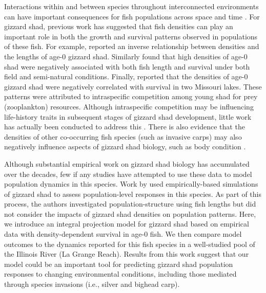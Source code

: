 \documentclass[preprint,review,12pt,authoryear]{elsarticle}
\begin{document}
Interactions within and between species throughout interconnected environments can have important consequences for fish populations across space and time \citep{thorp2006riverine}.  
For gizzard shad, previous work has suggested that fish densities can play an important role in both the growth and survival patterns observed in populations of these fish.  
For example, \citep{buynak1992differential} reported an inverse relationship between densities and the lengths of age-0 gizzard shad.  Similarly \citep{welker1994growth} found that high densities of age-0 shad were negatively associated with both fish length and survival under both field and semi-natural conditions. Finally, \citep{michaletz2010overwinter} reported that the densities of age-0 gizzard shad were negatively correlated with survival in two Missouri lakes.  
These patterns were attributed to intraspecific competition among young shad for prey (zooplankton) resources. Although intraspecific competition may be influencing life-history traits in subsequent stages of gizzard shad development, little work has actually been conducted to address this \citep{dicenzo1996relations}. 
There is also evidence that the densities of other co-occurring fish species (such as invasive carps) may also negatively influence aspects of gizzard shad biology, such as body condition \citep{irons2007reduced,love2018does}.

Although substantial empirical work on gizzard shad biology has accumulated over the decades, few if any studies have attempted to use these data to model population dynamics in this species.
Work by \citet{catalano2010size, catalano2011whole} used empirically-based simulations of gizzard shad to assess population-level responses in this species.
As part of this process, the authors investigated population-structure using fish lengths but did
not consider the impacts of gizzard shad densities on population patterns.
Here, we introduce an integral projection model for gizzard shad based on empirical data with density-dependent survival in age-0 fish.
We then compare model outcomes to the dynamics reported for this fish species in a well-studied pool of the Illinois River (La Grange Reach).
Results from this work suggest that our model could be an important tool for predicting gizzard shad population responses to changing environmental conditions, including those mediated through species invasions (i.e., silver and bighead carp).
\end{document}
